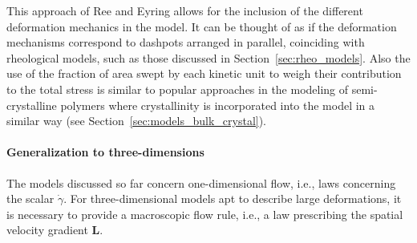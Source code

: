 This approach of Ree and Eyring allows for the inclusion of the different deformation mechanics in the model.
It can be thought of as if the deformation mechanisms correspond to dashpots arranged in parallel, coinciding with rheological models, such as those discussed in Section~\ref{sec:rheo_models}.
Also the use of the fraction of area swept by each kinetic unit to weigh their contribution to the total stress is similar to popular approaches in the modeling of semi-crystalline polymers where crystallinity is incorporated into the model in a similar way (see Section~\ref{sec:models_bulk_crystal}).

\paragraph{Generalization to three-dimensions}
The models discussed so far concern one-dimensional flow, i.e., laws concerning the scalar $\dot \gamma$.
For three-dimensional models apt to describe large deformations, it is necessary to provide a macroscopic flow rule, i.e., a law prescribing the spatial velocity gradient $\mathbf L$.


